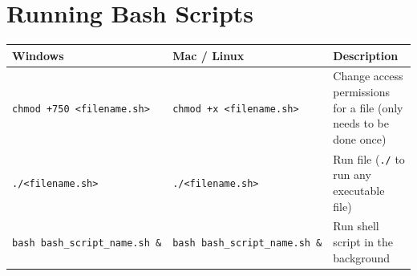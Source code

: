 \documentclass[]{book}
\begin{document}
\section{Running Bash Scripts}\label{running-bash-scripts}

\begin{longtable}[]{@{}lll@{}}
\toprule
\begin{minipage}[b]{0.13\columnwidth}\raggedright\strut
Windows\strut
\end{minipage} & \begin{minipage}[b]{0.18\columnwidth}\raggedright\strut
Mac / Linux\strut
\end{minipage} & \begin{minipage}[b]{0.18\columnwidth}\raggedright\strut
Description\strut
\end{minipage}\tabularnewline
\midrule
\endhead
\begin{minipage}[t]{0.13\columnwidth}\raggedright\strut
\texttt{chmod\ +750\ \textless{}filename.sh\textgreater{}}\strut
\end{minipage} & \begin{minipage}[t]{0.18\columnwidth}\raggedright\strut
\texttt{chmod\ +x\ \textless{}filename.sh\textgreater{}}\strut
\end{minipage} & \begin{minipage}[t]{0.18\columnwidth}\raggedright\strut
Change access permissions for a file (only needs to be done once)\strut
\end{minipage}\tabularnewline
\begin{minipage}[t]{0.13\columnwidth}\raggedright\strut
\texttt{./\textless{}filename.sh\textgreater{}}\strut
\end{minipage} & \begin{minipage}[t]{0.18\columnwidth}\raggedright\strut
\texttt{./\textless{}filename.sh\textgreater{}}\strut
\end{minipage} & \begin{minipage}[t]{0.18\columnwidth}\raggedright\strut
Run file (\texttt{./} to run any executable file)\strut
\end{minipage}\tabularnewline
\begin{minipage}[t]{0.13\columnwidth}\raggedright\strut
\texttt{bash\ bash\_script\_name.sh\ \&}\strut
\end{minipage} & \begin{minipage}[t]{0.18\columnwidth}\raggedright\strut
\texttt{bash\ bash\_script\_name.sh\ \&}\strut
\end{minipage} & \begin{minipage}[t]{0.18\columnwidth}\raggedright\strut
Run shell script in the background\strut
\end{minipage}\tabularnewline
\bottomrule
\end{longtable}
\end{document}
